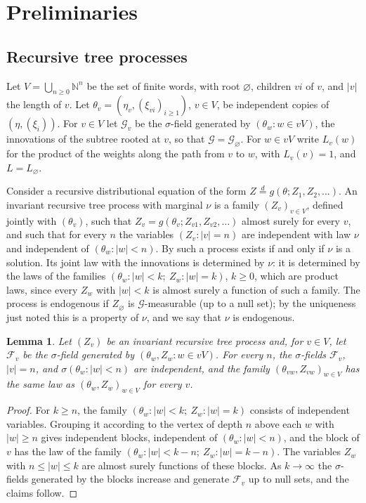 \documentclass[11pt]{amsart}
\newtheorem{lemma}[theorem]{Lemma}
\theoremstyle{remark}
\newcommand{\Ga}{\mathcal{G}}
\newcommand{\cF}{\mathcal{F}}
\newcommand{\N}{\mathbb{N}}
\begin{document}
\section{Preliminaries}\label{sec:prelim}

\subsection{Recursive tree processes}
Let $V=\bigcup_{n\ge0}\N^n$ be the set of finite words, with root $\varnothing$, children
$vi$ of $v$, and $|v|$ the length of $v$. Let $\theta_v=(\eta_v,(\xi_{vi})_{i\ge1})$,
$v\in V$, be independent copies of $(\eta,(\xi_i))$. For $v\in V$ let $\Ga_v$ be the
$\sigma$-field generated by $(\theta_w: w\in vV)$, the innovations of the subtree rooted at
$v$, so that $\Ga=\Ga_\varnothing$. For $w\in vV$ write $L_v(w)$ for the product of the
weights along the path from $v$ to $w$, with $L_v(v)=1$, and $L=L_\varnothing$.

Consider a recursive distributional equation of the form $Z\stackrel{d}{=}g(\theta;Z_1,Z_2,
\dots)$. An invariant recursive tree process with marginal $\nu$ is a family
$(Z_v)_{v\in V}$, defined jointly with $(\theta_v)$, such that
$Z_v=g(\theta_v;Z_{v1},Z_{v2},\dots)$ almost surely for every $v$, and such that for every
$n$ the variables $(Z_v:|v|=n)$ are independent with law $\nu$ and independent of
$(\theta_w:|w|<n)$. By \cite[Lemma~6]{AB} such a process exists if and only if $\nu$ is a
solution. Its joint law with the innovations is determined by $\nu$: it is determined by
the laws of the families $(\theta_w:|w|<k;\ Z_w:|w|=k)$, $k\ge0$, which are product laws,
since every $Z_w$ with $|w|<k$ is almost surely a function of such a family. The process
is endogenous if $Z_\varnothing$ is $\Ga$-measurable (up to a null set); by the uniqueness
just noted this is a property of $\nu$, and we say that $\nu$ is endogenous.

\begin{lemma}\label{lem:blocks}
Let $(Z_v)$ be an invariant recursive tree process and, for $v\in V$, let
$\cF_v$ be the $\sigma$-field generated by $(\theta_w,Z_w:w\in vV)$. For every $n$, the
$\sigma$-fields $\cF_v$, $|v|=n$, and $\sigma(\theta_w:|w|<n)$ are independent, and the
family $(\theta_{vw},Z_{vw})_{w\in V}$ has the same law as $(\theta_w,Z_w)_{w\in V}$ for
every $v$.
\end{lemma}

\begin{proof}
For $k\ge n$, the family $(\theta_w:|w|<k;\ Z_w:|w|=k)$ consists of independent variables.
Grouping it according to the vertex of depth $n$ above each $w$ with $|w|\ge n$ gives
independent blocks, independent of $(\theta_w:|w|<n)$, and the block of $v$ has the law of
the family $(\theta_w:|w|<k-n;\ Z_w:|w|=k-n)$. The variables $Z_w$ with $n\le|w|\le k$ are
almost surely functions of these blocks. As $k\to\infty$ the $\sigma$-fields generated by
the blocks increase and generate $\cF_v$ up to null sets, and the claims follow.
\end{proof}
\end{document}
